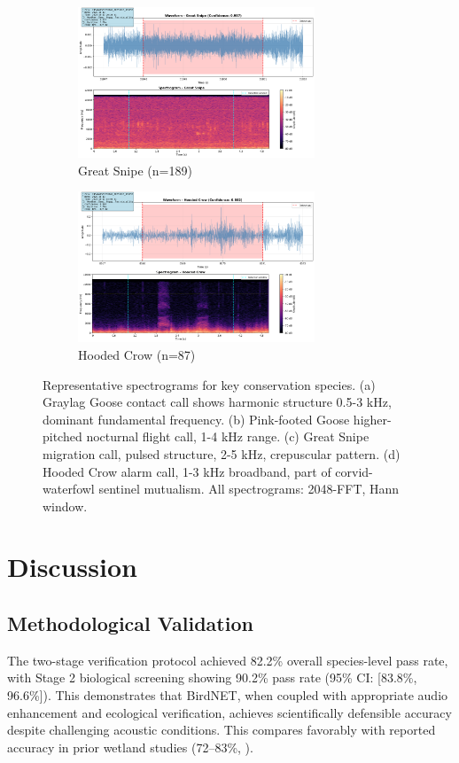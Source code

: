 \documentclass[english,twocolumn]{article}
\begin{document}
\begin{figure}[t]
\begin{subfigure}{0.47\textwidth}
\centering
\includegraphics[width=\textwidth,height=4.5cm,keepaspectratio]{figures/spectrogram_great_snipe.png}
\caption{Great Snipe (n=189)}
\end{subfigure}
\hfill
\begin{subfigure}{0.47\textwidth}
\centering
\includegraphics[width=\textwidth,height=4.5cm,keepaspectratio]{figures/spectrogram_hooded_crow.png}
\caption{Hooded Crow (n=87)}
\end{subfigure}
\caption{Representative spectrograms for key conservation species. (a) Graylag Goose contact call shows harmonic structure 0.5-3 kHz, dominant fundamental frequency. (b) Pink-footed Goose higher-pitched nocturnal flight call, 1-4 kHz range. (c) Great Snipe migration call, pulsed structure, 2-5 kHz, crepuscular pattern. (d) Hooded Crow alarm call, 1-3 kHz broadband, part of corvid-waterfowl sentinel mutualism. All spectrograms: 2048-FFT, Hann window.}
\label{fig:top_species_spectrograms}
\end{figure}

\section{Discussion}

\subsection{Methodological Validation}

The two-stage verification protocol achieved 82.2\% overall species-level pass rate, with Stage 2 biological screening showing 90.2\% pass rate (95\% CI: [83.8\%, 96.6\%]). This demonstrates that BirdNET, when coupled with appropriate audio enhancement and ecological verification, achieves scientifically defensible accuracy despite challenging acoustic conditions. This compares favorably with reported accuracy in prior wetland studies (72--83\%, \citet{Wood2022}).
\end{document}
